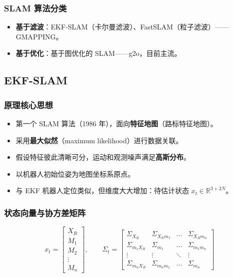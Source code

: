 \documentclass[11pt,a4paper]{article}
\begin{document}
\subsubsection*{SLAM 算法分类}
\begin{itemize}
  \item \textbf{基于滤波}：EKF-SLAM（卡尔曼滤波）、FastSLAM（粒子滤波）——GMAPPING。
  \item \textbf{基于优化}：基于图优化的 SLAM——g2o，目前主流。
\end{itemize}

\subsection{EKF-SLAM}

\subsubsection*{原理核心思想}
\begin{keypoint}
\begin{itemize}
  \item 第一个 SLAM 算法（1986 年），面向\textbf{特征地图}（路标特征地图）。
  \item 采用\textbf{最大似然}（maximum likelihood）进行数据关联。
  \item 假设特征彼此清晰可分，运动和观测噪声满足\textbf{高斯分布}。
  \item 以机器人初始位姿为地图坐标系原点。
  \item 与 EKF 机器人定位类似，但维度大大增加：待估计状态 $x_t\in\mathbb{R}^{3+2N}$。
\end{itemize}
\end{keypoint}

\subsubsection*{状态向量与协方差矩阵}
\[
x_t=\begin{bmatrix}X_R\\ M_1\\ M_2\\ \vdots\\ M_n\end{bmatrix},\qquad
\Sigma_t=\begin{bmatrix}
\Sigma_{X_R} & \Sigma_{X_R m_1} & \dots & \Sigma_{X_R m_n}\\
\Sigma_{m_1 X_R} & \Sigma_{m_1} & \dots & \Sigma_{m_1 m_n}\\
\vdots & \vdots & \ddots & \vdots\\
\Sigma_{m_n X_R} & \Sigma_{m_n m_1} & \dots & \Sigma_{m_n}
\end{bmatrix}
\]
\end{document}
